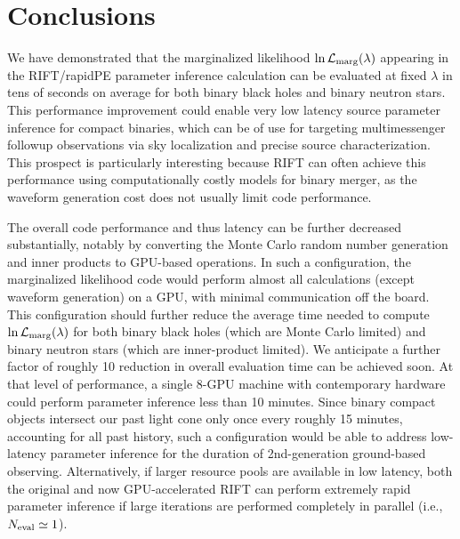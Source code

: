 \documentclass[twocolumn,prd,nofootinbib]{revtex4}
\newcommand\SkipForEarlyCirculation[1]{}
\newcommand\editremark[1]{{\color{red} #1}}
\begin{document}
\SkipForEarlyCirculation{
\section{ Results (optional?)}

*   Rerun all O2 BBHs with SEOBNRv3?  

* PP plot demo for zero-spin binaries, with profiling of full run?  

* reminder: HM for BNS break degeneracy, useful for source classification.  Show an example.

\editremark{bonus mentions}: eccentricity

Bonus code: lnLcut tapering, possibly neff tapering

Puffball in DAG every few iterations, to insure stability around edges and not overcover the core

}

\section{Conclusions}
\label{sec:conclude}
We have demonstrated that the marginalized likelihood $\ln {\cal L}_{\rm marg}(\lambda)$ appearing in the RIFT/rapidPE parameter
inference calculation can be evaluated at fixed $\lambda$ in tens of seconds on average for
both binary black holes and binary neutron stars.  This performance improvement could enable very low latency source
parameter inference for compact binaries, which can be of use for targeting multimessenger followup observations via sky
localization and  precise source characterization.     This prospect is particularly interesting because RIFT can
often achieve this performance using computationally costly models for binary merger, as the waveform generation cost
does not usually limit code performance.   


The overall code performance and thus latency can be further decreased substantially, notably by converting the Monte
Carlo random number generation and inner products to GPU-based operations.  In such a configuration, the marginalized
likelihood code would perform almost all calculations (except waveform generation) on a GPU, with minimal communication off
the board.  This configuration should further reduce the average time needed to compute $\ln {\cal L}_{\rm
  marg}(\lambda)$ for both binary black holes (which are Monte Carlo limited) and binary neutron stars (which are
inner-product limited).   We anticipate a further factor of roughly 10 reduction in overall evaluation time can be
achieved soon.  At that level of performance, a single 8-GPU machine with contemporary hardware could perform parameter inference less than 10
minutes.    Since binary compact objects intersect our past light cone only once every roughly 15 minutes, accounting
for all past history, such a configuration would be able to address low-latency parameter inference for the duration of
2nd-generation ground-based observing.
Alternatively, if larger resource pools are available in low latency, both the original and now GPU-accelerated RIFT  can
perform extremely rapid parameter inference if large iterations are performed completely in parallel (i.e., $N_{\rm
  eval} \simeq 1$).
\end{document}
